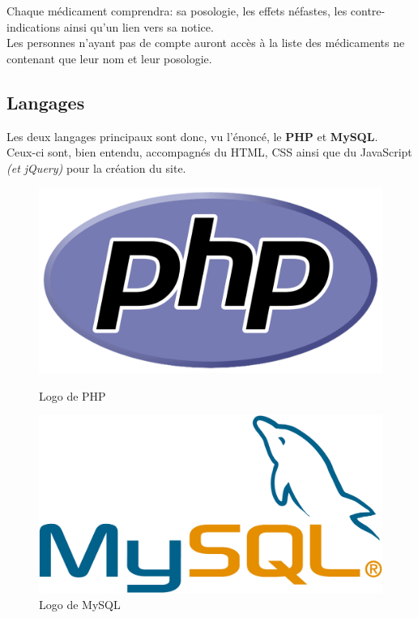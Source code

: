 Chaque médicament comprendra: sa posologie, les effets néfastes, les contre-\\indications ainsi qu'un lien vers sa notice.\\

Les personnes n’ayant pas de compte auront accès à la liste des médicaments ne contenant que leur nom et leur posologie.

\newpage


\subsection{Langages}
\label{sec:langages}

Les deux langages principaux sont donc, vu l'énoncé, le \textbf{PHP} et \textbf{MySQL}.\\
Ceux-ci sont, bien entendu, accompagnés du HTML, CSS ainsi que du JavaScript \textit{(et jQuery)} pour la création du site.

\vspace{1cm}

\begin{figure}[!h]
\centering
\begin{minipage}[c]{0.4\textwidth}
  \centering
  \includegraphics[scale=0.15]
  {textures/images/tools/php.pdf}
\caption{Logo de PHP}\label{php}
\end{minipage} \qquad
\begin{minipage}[c]{0.4\textwidth}
  \centering
  \includegraphics[scale=0.15]
  {textures/images/tools/mysql.pdf}
\caption{Logo de MySQL}\label{mysql}
\end{minipage}
\end{figure}


